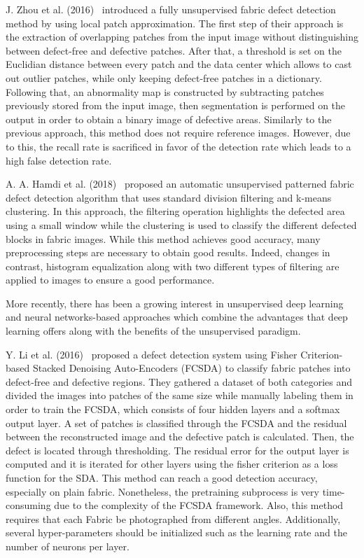 \documentclass[3p,,preprint,review,12pt]{elsarticle}
\begin{document}
J. Zhou et al. (2016)\unskip~\cite{981091:21201191} introduced a fully unsupervised fabric defect detection method by using local patch approximation. The first step of their approach is the extraction of overlapping patches from the input image without distinguishing between defect-free and defective patches. After that, a threshold is set on the Euclidian distance between every patch and the data center which allows to cast out outlier patches, while only keeping defect-free patches in a dictionary. Following that, an abnormality map is constructed by subtracting patches previously stored from the input image, then segmentation is performed on the output in order to obtain a binary image of defective areas. Similarly to the previous approach, this method does not require reference images. However, due to this, the recall rate is sacrificed in favor of the detection rate which leads to a high false detection rate.

A. A. Hamdi et al. (2018)\unskip~\cite{981091:21201201} proposed an automatic unsupervised patterned fabric defect detection algorithm that uses standard division filtering and k-means clustering. In this approach, the filtering operation highlights the defected area using a small window while the clustering is used to classify the different defected blocks in fabric images. While this method achieves good accuracy, many preprocessing steps are necessary to obtain good results. Indeed, changes in contrast, histogram equalization along with two different types of filtering are applied to images to ensure a good performance. 

More recently, there has been a growing interest in unsupervised deep learning and neural networks-based approaches which combine the advantages that deep learning offers along with the benefits of the unsupervised paradigm. 

Y. Li et al. (2016)\unskip~\cite{981091:21201196} proposed a defect detection system using Fisher Criterion-based Stacked Denoising Auto-Encoders (FCSDA) to classify fabric patches into defect-free and defective regions. They gathered a dataset of both categories and divided the images into patches of the same size while manually labeling them in order to train the FCSDA, which consists of four hidden layers and a softmax output layer. A set of patches is classified through the FCSDA and the residual between the reconstructed image and the defective patch is calculated. Then, the defect is located through thresholding. The residual error for the output layer is computed and it is iterated for other layers using the fisher criterion as a loss function for the SDA. This method can reach a good detection accuracy, especially on plain fabric. Nonetheless, the pretraining subprocess is very time-consuming due to the complexity of the FCSDA framework. Also, this method requires that each Fabric be photographed from different angles. Additionally, several hyper-parameters should be initialized such as the learning rate and the number of neurons per layer. 
\end{document}
